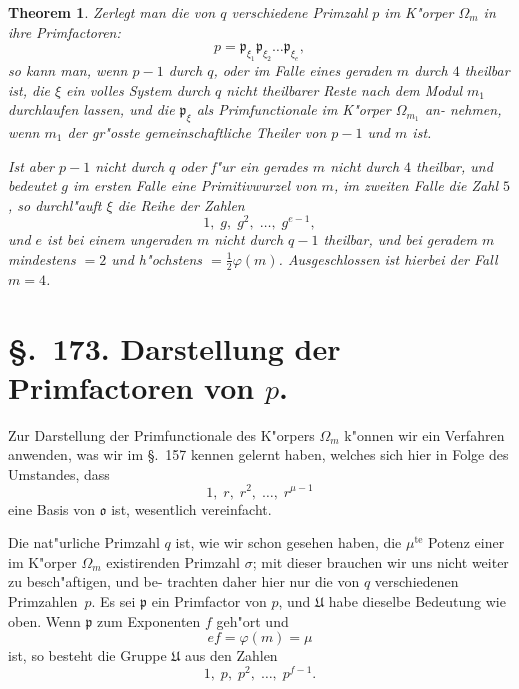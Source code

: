 \documentclass[12pt,a4paper]{article}
\theoremstyle{weber}
\newtheorem*{theorem}{Theorem}
\begin{document}
\begin{theorem}
Zerlegt man die von $q$ verschiedene Primzahl $p$
im K"orper $\varOmega_m$ in ihre Primfactoren:
\[
p = \mathfrak{p}_{\xi_1}\mathfrak{p}_{\xi_2}\dots\mathfrak{p}_{\xi_e},
\]
so kann man, wenn $p - 1$ durch $q$, oder im Falle
eines geraden $m$ durch $4$ theilbar ist, die $\xi$ ein
volles System durch $q$ nicht theilbarer Reste
nach dem Modul $m_1$ durchlaufen lassen, und
die $\mathfrak{p}_\xi$ als Primfunctionale im K"orper $\varOmega_{m_1}$ an-
nehmen, wenn $m_1$ der gr"osste gemeinschaftliche
Theiler von $p - 1$ und $m$ ist.

Ist aber $p - 1$ nicht durch $q$ oder f"ur ein
gerades $m$ nicht durch $4$ theilbar, und bedeutet $g$
im ersten Falle eine Primitivwurzel von $m$, im
zweiten Falle die Zahl $5$, so durchl"auft $\xi$ die
Reihe der Zahlen
\[
1,\; g,\; g^2,\; \dots,\; g^{e-1},
\]
und $e$ ist bei einem ungeraden $m$ nicht durch
$q - 1$ theilbar, und bei geradem $m$ mindestens
$= 2$ und h"ochstens $= \tfrac{1}{2}\varphi(m)$. Ausgeschlossen ist
hierbei der Fall $m = 4$.
\end{theorem}

\newpage
\section*{\S.~173. Darstellung der Primfactoren von $p$.}

Zur Darstellung der Primfunctionale des K"orpers $\varOmega_m$ k"onnen
wir ein Verfahren anwenden, was wir im \S.~157 kennen gelernt
haben, welches sich hier in Folge des Umstandes, dass
\[
1,\; r,\; r^2,\; \dots,\; r^{\mu-1}
\]
eine Basis von $\mathfrak{o}$ ist, wesentlich vereinfacht.

Die nat"urliche Primzahl $q$ ist, wie wir schon gesehen haben,
die $\mu^{\mathrm{te}}$ Potenz einer im K"orper $\varOmega_m$ existirenden Primzahl $\sigma$; mit
dieser brauchen wir uns nicht weiter zu besch"aftigen, und be-
trachten daher hier nur die von $q$ verschiedenen Primzahlen~$p$.
Es sei $\mathfrak{p}$ ein Primfactor von $p$, und $\mathfrak{U}$ habe dieselbe Bedeutung
wie oben. Wenn $\mathfrak{p}$ zum Exponenten $f$ geh"ort und
\[
ef = \varphi(m) = \mu
\]
ist, so besteht die Gruppe $\mathfrak{U}$ aus den Zahlen
\[
1,\; p,\; p^2,\; \dots,\; p^{f-1}.
\]
\end{document}
